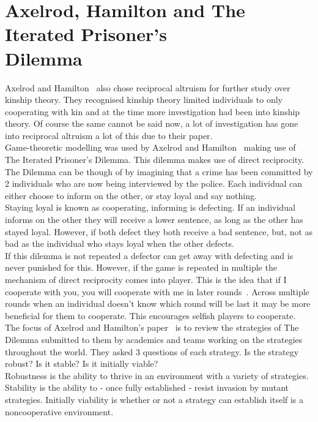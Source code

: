 \documentclass[]{final_report}
\begin{document}
\section{Axelrod, Hamilton and The Iterated Prisoner's\\ Dilemma}
\label{sec:ipd}
Axelrod and Hamilton~\cite{evolution_of_cooperation} also chose reciprocal altruism for further study over kinship theory. They recognised kinship theory limited individuals to only cooperating with kin and at the time more investigation had been into kinship theory. Of course the same cannot be said now, a lot of investigation has gone into reciprocal altruism a lot of this due to their paper.\\
Game-theoretic modelling was used by Axelrod and Hamilton~\cite{evolution_of_cooperation} making use of The Iterated Prisoner's Dilemma. This dilemma makes use of direct reciprocity. The Dilemma can be though of by imagining that a crime has been committed by 2 individuals who are now being interviewed by the police. Each individual can either choose to inform on the other, or stay loyal and say nothing.\\
Staying loyal is known as cooperating, informing is defecting. If an individual informs on the other they will receive a lower sentence, as long as the other has stayed loyal. However, if both defect they both receive a bad sentence, but, not as bad as the individual who stays loyal when the other defects.\\
If this dilemma is not repeated a defector can get away with defecting and is never punished for this. However, if the game is repeated in multiple the mechanism of direct reciprocity comes into player. This is the idea that if I cooperate with you, you will cooperate with me in later rounds~\cite{five_rules_coop}. Across multiple rounds when an individual doesn't know which round will be last it may be more beneficial for them to cooperate. This encourages selfish players to cooperate.\\
The focus of Axelrod and Hamilton's paper~\cite{evolution_of_cooperation} is to review the strategies of The Dilemma submitted to them by academics and teams working on the strategies throughout the world. They asked 3 questions of each strategy. Is the strategy robust? Is it stable? Is it initially viable?\\
Robustness is the ability to thrive in an environment with a variety of strategies. Stability is the ability to - once fully established - resist invasion by mutant strategies. Initially viability is whether or not a strategy can establish itself is a noncooperative environment.\\
\end{document}
